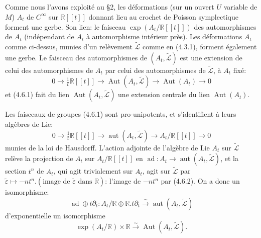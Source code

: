 \documentclass[11pt,a4paper]{article}
\theoremstyle{plain}
\theoremstyle{definition}
\DeclareMathOperator{\Aut}{Aut}
\DeclareMathOperator{\aut}{aut}
\DeclareMathOperator{\ad}{ad}
\newcommand{\R}{\mathbb{R}}
\newcommand{\iso}{\xrightarrow{\sim}}
\begin{document}
\subsection{}
Comme nous l'avons exploit\'e au \S 2, les d\'eformations (sur un ouvert $U$ variable
de $M$) $A_{t}$ de $C^{\infty}$ sur $\R[[t]]$ donnant lieu au crochet de Poisson symplectique forment
une gerbe. Son lien: le faisceau $\exp(A_{t}/\R[[t]])$ des automorphismes de $A_{t}$ (ind\'ependant de $A_{t}$ \`a automorphisme int\'erieur pr\`es). Les d\'eformations $A_{t}$ comme ci-dessus, munies d'un rel\`evement $\widetilde{\mathcal{L}}$ comme en (4.3.1), forment \'egalement une gerbe. Le faisceau des automorphismes de $(A_{t}, \widetilde{\mathcal{L}})$ est une extension de celui des automorphismes de $A_{t}$ par celui des automorphismes de $\widetilde{\mathcal{L}}$, \`a $A_{t}$ fix\'e:
\begin{equation}
0 \longrightarrow \tfrac{1}{t}\R[[t]] \longrightarrow \Aut(A_{t}, \widetilde{\mathcal{L}}) \longrightarrow \Aut(A_{t}) \longrightarrow 0 \tag{4.6.1}
\end{equation}
et (4.6.1) fait du lien $\Aut(A_{t}, \widetilde{\mathcal{L}})$ une extension centrale du lien $\Aut(A_{t})$.

Les faisceaux de groupes (4.6.1) sont pro-unipotents, et s'identifient \`a leurs alg\`ebres de Lie:
\begin{equation}
0 \longrightarrow \tfrac{1}{t}\R[[t]] \longrightarrow \aut(A_{t}, \widetilde{\mathcal{L}}) \longrightarrow A_{t}/\R[[t]] \longrightarrow 0 \tag{4.6.2}
\end{equation}
munies de la loi de Hausdorff. L'action adjointe de l'alg\`ebre de Lie $A_{t}$ sur $\widetilde{\mathcal{L}}$ rel\`eve la projection de $A_{t}$ sur $A_{t}/\R[[t]]$ en $\ad: A_{t} \to \aut(A_{t}, \widetilde{\mathcal{L}})$, et la section $t^{n}$ de $A_{t}$, qui agit trivialement sur $A_{t}$, agit sur $\widetilde{\mathcal{L}}$ par $\tilde{\varepsilon} \mapsto -nt^{n}.(\text{image de } \tilde{\varepsilon} \text{ dans } \R)$: l'image de $-nt^{n}$ par (4.6.2). On a donc un isomorphisme:
\[
\ad \oplus t\partial_{t}: A_{t}/\R \oplus \R.t\partial_{t} \iso \aut(A_{t}, \widetilde{\mathcal{L}})
\]
d'exponentielle un isomorphisme
\begin{equation}
\exp(A_{t}/\R) \times \R \iso \Aut(A_{t}, \widetilde{\mathcal{L}}). \tag{4.6.3}
\end{equation}
\end{document}
